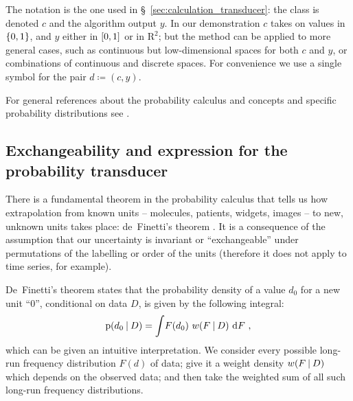 \documentclass[\ifafour a4paper,12pt,\else a5paper,10pt,\fi%
onecolumn,oneside,article,%
british%
]{memoir}
\theoremstyle{remark}
\theoremstyle{innote}
\newcommand*{\di}{\mathrm{d}}%
\newcommand*{\RR}{\bm{\mathrm{R}}}
\newcommand*{\defd}{\coloneqq}
\DeclarePairedDelimiter\clcl{[}{]}
\DeclarePairedDelimiter\set{\{}{\}} %
\newcommand*{\p}{\mathrm{p}}%
\renewcommand*{\|}[1][]{\nonscript\:#1\vert\nonscript\:\mathopen{}}
\newcommand*{\sect}{\S}%
\newcommand*{\chap}{ch.}%
\newcommand*{\wf}{w}
\begin{document}
The notation is the one used in \sect~\ref{sec:calculation_transducer}: the class is denoted $c$ and the algorithm output $y$. In our demonstration $c$ takes on values in $\set{0,1}$, and $y$ either in $\clcl{0,1}$ or in $\RR^{2}$; but the method can be applied to more general cases, such as continuous but low-dimensional spaces for both $c$ and $y$, or combinations of continuous and discrete spaces. For convenience we use a single symbol for the pair $d \defd (c, y)$.

For general references about the probability calculus and concepts and specific probability distributions see \cites{jaynes1994_r2003,mackay1995_r2005,jeffreys1939_r1983,gregory2005,bernardoetal1994_r2000,hailperin1996,good1950,johnsonetal1969_r1996,johnsonetal1969b_r2005,johnsonetal1970_r1994,johnsonetal1970b_r1995,kotzetal1972_r2000}.

\subsection{Exchangeability and expression for the probability transducer}
\label{sec:deFinetti}



There is a fundamental theorem in the probability calculus that tells us how extrapolation from known units -- molecules, patients, widgets, images -- to new, unknown units takes place: de~Finetti's theorem \autocites[\chap~4]{bernardoetal1994_r2000}{dawid2013,definetti1929,definetti1937}. It is a consequence of the assumption that our uncertainty is invariant or \enquote{exchangeable} under permutations of the labelling or order of the units (therefore it does not apply to time series, for example).

De~Finetti's theorem states that the probability density of a value $d_{0}$ for a new unit \enquote{0}, conditional on data $D$, is given by the following integral:
\begin{equation}
  \label{eq:prob_is_expe_freq}
  \p(d_{0} \| D) = \int\! F(d_{0})\ \wf(F \| D)\ \di F \ ,
\end{equation}
which can be given an intuitive interpretation. We consider every possible long-run frequency distribution $F(d)$ of data; give it a weight density $\wf(F \| D)$ which depends on the observed data; and then take the weighted sum of all such long-run frequency distributions.
\end{document}
